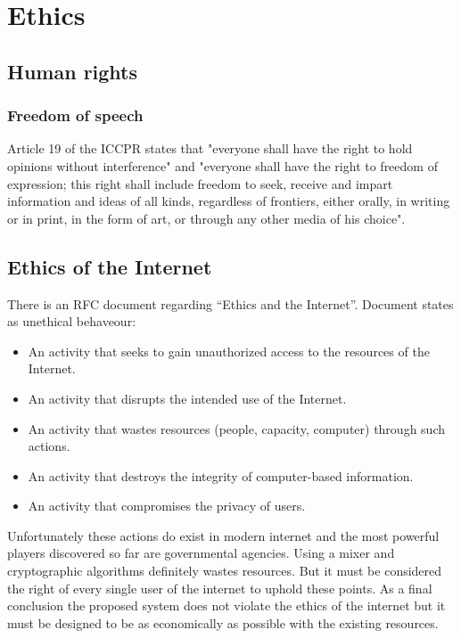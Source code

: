 \section{Ethics}
\subsection{Human rights}
\subsubsection{Freedom of speech}
Article 19 of the ICCPR states that "everyone shall have the right to hold opinions without interference" and "everyone shall have the right to freedom of expression; this right shall include freedom to seek, receive and impart information and ideas of all kinds, regardless of frontiers, either orally, in writing or in print, in the form of art, or through any other media of his choice".

\subsection{Ethics of the Internet}
There is an RFC document regarding ``Ethics and the Internet''\cite[p.~1]{RFC1087}. Document states as unethical behaveour:
\begin{itemize}
\item An activity that seeks to gain unauthorized access to the resources of the Internet.
\item An activity that disrupts the intended use of the Internet.
\item An activity that wastes resources (people, capacity, computer) through such actions.
\item An activity that destroys the integrity of computer-based information.
\item An activity that compromises the privacy of users.
\end{itemize}
Unfortunately these actions do exist in modern internet and the most powerful players discovered so far are governmental agencies. Using a mixer and cryptographic algorithms definitely wastes resources. But it must be considered the right of every single user of the internet to uphold these points. As a final conclusion the proposed system does not violate the ethics of the internet but it must be designed to be as economically as possible with the existing resources.

